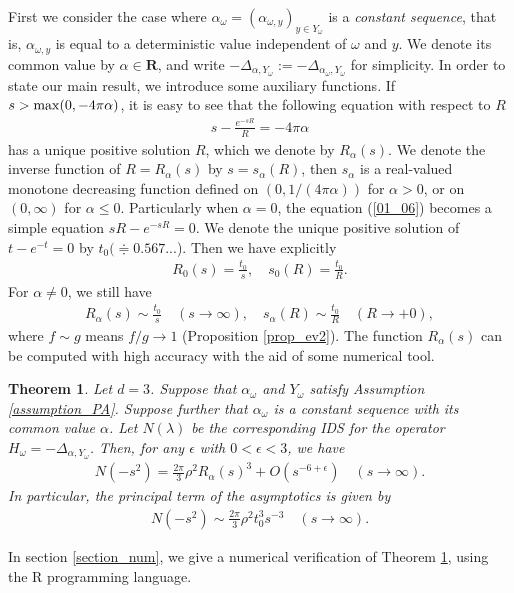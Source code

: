 \documentclass[12pt,a4paper]{article}
\newtheorem{theorem}{Theorem}[section]
\def\max{\mathop{\rm max}\limits}
\begin{document}
First we consider the case where $\alpha_\omega=(\alpha_{\omega,y})_{y\in Y_\omega}$ is a \textit{constant sequence},
that is, $\alpha_{\omega,y}$ is equal to a deterministic value 
independent of $\omega$ and $y$.
We  denote its common value by $\alpha\in \mathbf{R}$,
and write 
$-\Delta_{\alpha,Y_\omega}:=-\Delta_{\alpha_\omega,Y_\omega}$
for simplicity.
In order to state our main result, we introduce some auxiliary functions.
If $s>\max (0,-4\pi \alpha)$,
it is easy to see that 
the following equation with respect to $R$
\begin{align}
\label{01_06}
 s-\frac{e^{-sR}}{R}=-4\pi \alpha
\end{align}
has a unique positive solution $R$,
which we denote by $R_\alpha(s)$.
We denote the inverse function of $R=R_\alpha(s)$
by $s=s_\alpha(R)$,
then $s_\alpha$ is a real-valued monotone decreasing function defined on
$(0,1/(4\pi \alpha))$ for $\alpha>0$,
or 
on $(0,\infty)$ for $\alpha\leq 0$.
Particularly when $\alpha=0$,
the equation (\ref{01_06}) becomes
a simple equation $sR-e^{-sR}=0$.
We denote the unique positive solution of $t-e^{-t}=0$ by 
$t_0(\doteqdot 0.567...$).
Then we have explicitly
\begin{align*}
R_0(s) =\frac{t_0}{s},\quad
s_0(R)=\frac{t_0}{R}.
\end{align*}
For $\alpha\not= 0$, we still have 
\begin{align}
 \label{01_07}
R_\alpha(s)\sim \frac{t_0}{s} \quad(s\to \infty),\quad
s_\alpha(R)\sim \frac{t_0}{R} \quad(R\to +0),
\end{align}
where $f\sim g$ means $f/g\to 1$
(Proposition \ref{prop_ev2}).
The function $R_\alpha(s)$ can be 
computed with high accuracy
with the aid of some numerical tool.


\begin{theorem}
 \label{theorem_asymptotics_IDS}
Let $d=3$.
Suppose that $\alpha_\omega$ and $Y_\omega$ satisfy
Assumption \ref{assumption_PA}.
Suppose further that
$\alpha_\omega$ is a constant sequence
with its common value $\alpha$.
Let $N(\lambda)$ be the corresponding IDS
for the operator $H_\omega=-\Delta_{\alpha,Y_\omega}$.
Then, for any $\epsilon$ with $0<\epsilon<3$,
we have
\begin{align}
\label{01_08}
N(-s^2)=\frac{2\pi}{3}\rho^2 R_\alpha(s)^3 + O(s^{-6+\epsilon})
\quad(s\to \infty).
\end{align}
In particular, the principal term of the asymptotics is given by
\begin{align}
\label{01_09}
 N(-s^2) \sim \frac{2\pi}{3}\rho^2 t_0^3s^{-3}\quad
(s\to\infty).
\end{align}
\end{theorem}
\noindent
In section \ref{section_num}, we give a numerical verification
of Theorem \ref{theorem_asymptotics_IDS},
using the R programming language.
\end{document}
